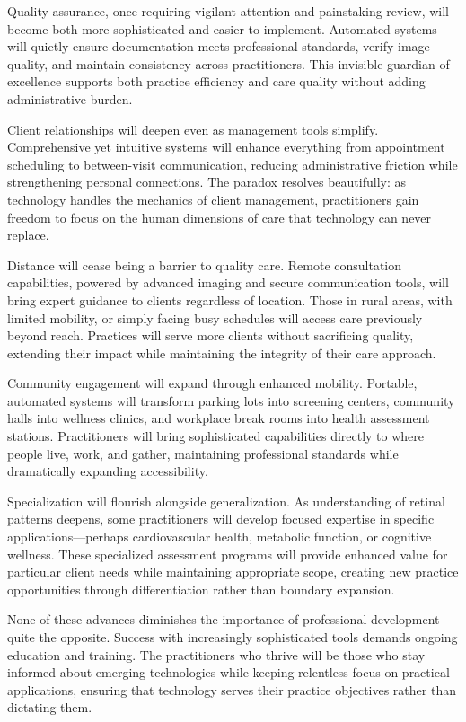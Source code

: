 \documentclass[
  Letterpaper,
]{scrbook}
\begin{document}
Quality assurance, once requiring vigilant attention and painstaking
review, will become both more sophisticated and easier to implement.
Automated systems will quietly ensure documentation meets professional
standards, verify image quality, and maintain consistency across
practitioners. This invisible guardian of excellence supports both
practice efficiency and care quality without adding administrative
burden.

Client relationships will deepen even as management tools simplify.
Comprehensive yet intuitive systems will enhance everything from
appointment scheduling to between-visit communication, reducing
administrative friction while strengthening personal connections. The
paradox resolves beautifully: as technology handles the mechanics of
client management, practitioners gain freedom to focus on the human
dimensions of care that technology can never replace.

Distance will cease being a barrier to quality care. Remote consultation
capabilities, powered by advanced imaging and secure communication
tools, will bring expert guidance to clients regardless of location.
Those in rural areas, with limited mobility, or simply facing busy
schedules will access care previously beyond reach. Practices will serve
more clients without sacrificing quality, extending their impact while
maintaining the integrity of their care approach.

Community engagement will expand through enhanced mobility. Portable,
automated systems will transform parking lots into screening centers,
community halls into wellness clinics, and workplace break rooms into
health assessment stations. Practitioners will bring sophisticated
capabilities directly to where people live, work, and gather,
maintaining professional standards while dramatically expanding
accessibility.

Specialization will flourish alongside generalization. As understanding
of retinal patterns deepens, some practitioners will develop focused
expertise in specific applications---perhaps cardiovascular health,
metabolic function, or cognitive wellness. These specialized assessment
programs will provide enhanced value for particular client needs while
maintaining appropriate scope, creating new practice opportunities
through differentiation rather than boundary expansion.

None of these advances diminishes the importance of professional
development---quite the opposite. Success with increasingly
sophisticated tools demands ongoing education and training. The
practitioners who thrive will be those who stay informed about emerging
technologies while keeping relentless focus on practical applications,
ensuring that technology serves their practice objectives rather than
dictating them.
\end{document}
